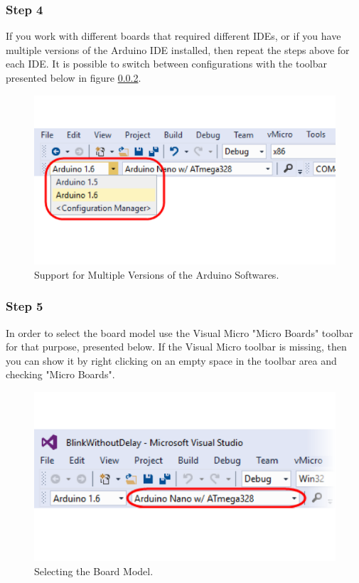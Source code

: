 \begin{refsection}
	\subsubsection{Step 4}
	If you work with different boards that required different IDEs, or if you have multiple versions of the Arduino IDE installed, then repeat the steps above for each IDE. It is possible to switch between configurations with the toolbar presented below in figure \ref{}.
	
	\begin{figure}[H]
		\centering
		\includegraphics[width=0.7\linewidth]{./sdf/arduino_quantum_rx/figures/multipleIDEversions.pdf}
		\caption{Support for Multiple Versions of the Arduino Softwares.}
		\label{multipleIDEversions}
	\end{figure}
	
	
	\subsubsection{Step 5}
	
	In order to select the board model use the Visual Micro "Micro Boards" toolbar for that purpose, presented below. If the Visual Micro toolbar is missing, then you can show it by right clicking on an empty space in the toolbar area and checking "Micro Boards".
	
	
	\begin{figure}[H]
		\centering
		\includegraphics[width=0.7\linewidth]{./sdf/arduino_quantum_rx/figures/boardSelect.pdf}
		\caption{Selecting the Board Model.}
		\label{boardSelect}
	\end{figure}
	

\end{refsection}
